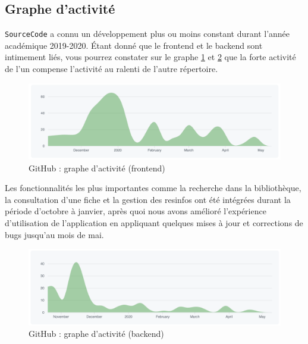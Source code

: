 \subsection{Graphe d'activité}

\texttt{SourceCode} a connu un développement plus ou moins constant durant l'année académique 2019-2020. Étant donné que le \gls{frontend} et le \gls{backend} sont intimement liés, vous pourrez constater sur le graphe \ref{figure:frontendActivity} et \ref{figure:backendActivity} que la forte activité de l'un compense l'activité au ralenti de l'autre répertoire.

\begin{figure}[H]
    \includegraphics[width=\textwidth,height=0.3\textheight,keepaspectratio]{images/analyseCritique/graph_frontend.png}
    \centering
    \caption{GitHub : graphe d'activité (frontend)}
    \label{figure:frontendActivity}
\end{figure}

Les fonctionnalités les plus importantes comme la recherche dans la bibliothèque, la consultation d'une \gls{fiche} et la gestion des \glspl{resinfo} ont été intégrées durant la période d'octobre à janvier, après quoi nous avons amélioré l'expérience d'utilisation de l'application en appliquant quelques mises à jour et corrections de bugs jusqu'au mois de mai.\\

\begin{figure}[H]
    \includegraphics[width=\textwidth,height=0.3\textheight,keepaspectratio]{images/analyseCritique/graph_backend.png}
    \centering
    \caption{GitHub : graphe d'activité (backend)}
    \label{figure:backendActivity}
\end{figure}


